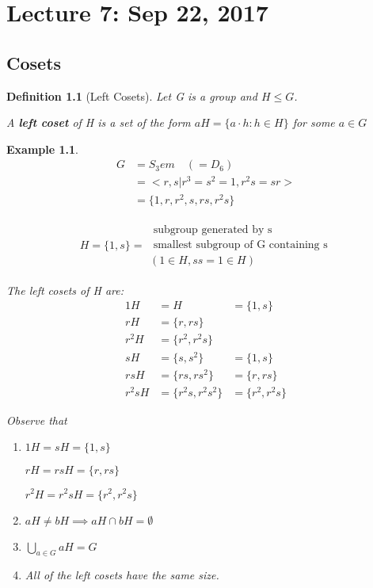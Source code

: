 \documentclass[11pt, oneside]{book}
\theoremstyle{break}
\newtheorem{defn}{Definition}[section]
\newtheorem{eg}{Example}[section]
\begin{document}
\chapter{Lecture 7: Sep 22, 2017}\label{chp:lec7}

\section{Cosets}\label{sect:cosets}

\begin{defn}[Left Cosets]
    Let G is a group and $H \leq G$.

    A \textbf{left coset} of H is a set of the form $aH = \{a \cdot h : h \in H\}$ for some $a \in G$
\end{defn}

\begin{eg}
    \begin{align*}
        G &= S_3em\quad (= D_6) \\
          &= <r, s | r^3 = s^2 = 1, r^2s = sr > \\
          &= \{1, r, r^2, s, rs, r^2 s\}
    \end{align*}

    \begin{align*}
        H = \{1, s\} = \substack{\text{ subgroup generated by s} \\ \text{ smallest subgroup of G containing s} \\ (1 \in H, ss = 1 \in H)}
    \end{align*}

    The left cosets of H are:
    \begin{align*}
        1H   &= H    &= \{1, s\} \\
        rH   &= \{r, rs\} &\\
        r^2 H &= \{r^2, r^2s\} &\\
        sH   &= \{s, s^2\}   &= \{1, s\} \\
        rsH  &= \{rs, rs^2\} &= \{r, rs\} \\
        r^2 sH  &= \{r^2s, r^2s^2\} &= \{r^2, r^2s\}
    \end{align*}

    Observe that
    \begin{enumerate}
        \item $1H = sH = \{1, s\}$

            $rH = rsH = \{r, rs\}$

            $r^2H = r^2sH = \{r^2, r^2s\}$
        \item $aH \neq bH \implies aH \cap bH = \emptyset$
        \item $\bigcup_{a \in G} aH = G$
        \item All of the left cosets have the same size.
    \end{enumerate}
\end{eg}
\end{document}
